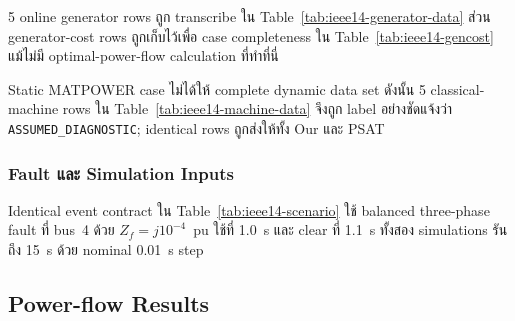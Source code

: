 \documentclass[12pt,a4paper]{article}
\begin{document}
5 online generator rows ถูก transcribe ใน Table~\ref{tab:ieee14-generator-data} ส่วน generator-cost rows ถูกเก็บไว้เพื่อ case completeness ใน Table~\ref{tab:ieee14-gencost} แม้ไม่มี optimal-power-flow calculation ที่ทำที่นี่

\begin{table}[H]\centering\scriptsize
\caption{MATPOWER IEEE14 online generator data}
\label{tab:ieee14-generator-data}
\resizebox{\textwidth}{!}{}
\end{table}

\begin{table}[H]\centering\small
\caption{MATPOWER IEEE14 polynomial generator-cost data ที่ retain จาก source case}
\label{tab:ieee14-gencost}
\resizebox{.86\textwidth}{!}{}
\end{table}

Static MATPOWER case ไม่ได้ให้ complete dynamic data set ดังนั้น 5 classical-machine rows ใน Table~\ref{tab:ieee14-machine-data} จึงถูก label อย่างชัดแจ้งว่า \texttt{ASSUMED\_DIAGNOSTIC}; identical rows ถูกส่งให้ทั้ง Our และ PSAT

\begin{table}[H]\centering\small
\caption{Classical-machine parameters ที่ใช้เหมือนกันโดย Our และ PSAT}
\label{tab:ieee14-machine-data}
\resizebox{.86\textwidth}{!}{}
\end{table}

\subsubsection{Fault และ Simulation Inputs}

Identical event contract ใน Table~\ref{tab:ieee14-scenario} ใช้ balanced three-phase fault ที่ bus~4 ด้วย $Z_f=j10^{-4}$~pu ใช้ที่ 1.0~s และ clear ที่ 1.1~s ทั้งสอง simulations รันถึง 15~s ด้วย nominal 0.01~s step

\begin{table}[H]\centering\small
\caption{Identical IEEE14 model และ event inputs ที่ supply ให้ทั้ง Our และ PSAT}
\label{tab:ieee14-scenario}
\resizebox{\textwidth}{!}{}
\end{table}

\subsection{Power-flow Results}
\end{document}
